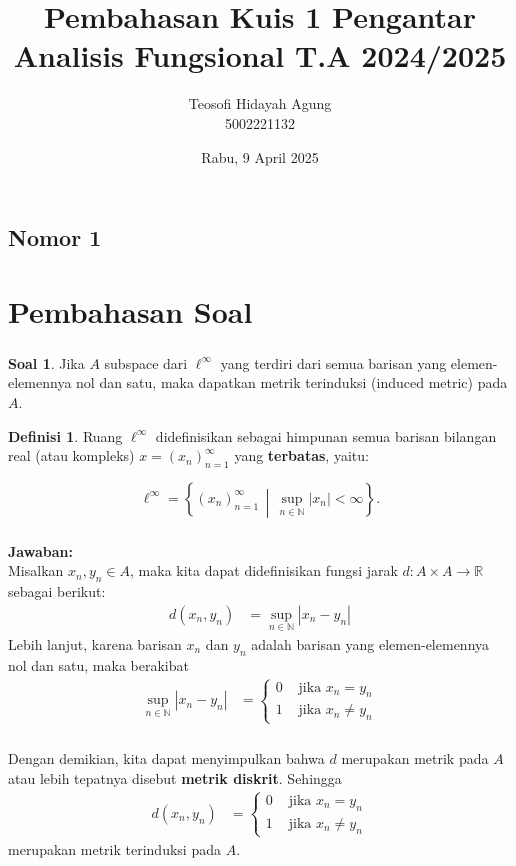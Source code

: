 \documentclass[aspectratio=169]{beamer}
\date{Rabu, 9 April 2025}
\title[Pengantar Analisis Fungsional]{Pembahasan Kuis 1 Pengantar Analisis Fungsional T.A 2024/2025}
\author[Teo]{Teosofi Hidayah Agung\\5002221132}
\institute[Matematika ITS]{Departemen Matematika\\ Institut Teknologi Sepuluh Nopember}
\theoremstyle{definition}
\newtheorem{definisi}{Definisi}
\newtheorem{soal}{Soal}
\begin{document}
    \begin{frame}
        \titlepage
\end{frame}

\subsection{Nomor 1}
\section{Pembahasan Soal}
\begin{frame}
  \frametitle{\insertsection}
  \begin{soal}
    Jika $A$ subspace dari $\ell^\infty$ yang terdiri dari semua barisan yang elemen-elemennya nol dan satu, maka dapatkan metrik terinduksi (induced metric) pada $A$.
  \end{soal}
  \begin{definisi}
    Ruang \( \ell^\infty \) didefinisikan sebagai himpunan semua barisan bilangan real (atau kompleks) \( x = (x_n)_{n=1}^\infty \) yang \textbf{terbatas}, yaitu:

    \[
    \ell^\infty = \left\{ (x_n)_{n=1}^\infty \,\middle|\, \sup_{n \in \mathbb{N}} |x_n| < \infty \right\}.
    \]
    
  \end{definisi}
\end{frame}


\begin{frame}
  \frametitle{\insertsection}
  \framesubtitle{\insertsubsection}
  \textbf{Jawaban:}\\
  Misalkan $x_n, y_n \in A$, maka kita dapat didefinisikan fungsi jarak $d: A \times A \to \mathbb{R}$ sebagai berikut:
  \begin{align*}
    d(x_n, y_n) &= \sup_{n \in \mathbb{N}} |x_n - y_n| 
  \end{align*}
  Lebih lanjut, karena barisan $x_n$ dan $y_n$ adalah barisan yang elemen-elemennya nol dan satu, maka berakibat 
  \begin{align*}
    \sup_{n \in \mathbb{N}} |x_n - y_n| &= \begin{cases}
      0 & \text{ jika } x_n = y_n\\
      1 & \text{ jika } x_n \neq y_n
    \end{cases}
  \end{align*}
\end{frame}

\begin{frame}
  \frametitle{\insertsection}
  \framesubtitle{\insertsubsection}
  Dengan demikian, kita dapat menyimpulkan bahwa $d$ merupakan metrik pada $A$ atau lebih tepatnya disebut \textbf{metrik diskrit}. Sehingga
  \begin{align*}
    d(x_n, y_n) &= \begin{cases}
      0 & \text{ jika } x_n = y_n\\
      1 & \text{ jika } x_n \neq y_n
    \end{cases}
  \end{align*}
  merupakan metrik terinduksi pada $A$.
\end{frame}
\end{document}
